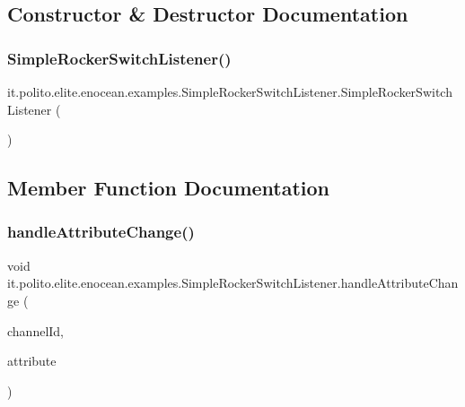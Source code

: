\subsection{Constructor \& Destructor Documentation}
\hypertarget{classit_1_1polito_1_1elite_1_1enocean_1_1examples_1_1_simple_rocker_switch_listener_a7d484d2ffa6d7c912dabd28a76becdda}{}\label{classit_1_1polito_1_1elite_1_1enocean_1_1examples_1_1_simple_rocker_switch_listener_a7d484d2ffa6d7c912dabd28a76becdda} 
\subsubsection{\texorpdfstring{Simple\+Rocker\+Switch\+Listener()}{SimpleRockerSwitchListener()}}
{\footnotesize\ttfamily it.\+polito.\+elite.\+enocean.\+examples.\+Simple\+Rocker\+Switch\+Listener.\+Simple\+Rocker\+Switch\+Listener (\begin{DoxyParamCaption}{ }\end{DoxyParamCaption})}



\subsection{Member Function Documentation}
\hypertarget{classit_1_1polito_1_1elite_1_1enocean_1_1examples_1_1_simple_rocker_switch_listener_a240a314a6f13130d31c70dac34ad0348}{}\label{classit_1_1polito_1_1elite_1_1enocean_1_1examples_1_1_simple_rocker_switch_listener_a240a314a6f13130d31c70dac34ad0348} 
\subsubsection{\texorpdfstring{handle\+Attribute\+Change()}{handleAttributeChange()}}
{\footnotesize\ttfamily void it.\+polito.\+elite.\+enocean.\+examples.\+Simple\+Rocker\+Switch\+Listener.\+handle\+Attribute\+Change (\begin{DoxyParamCaption}\item[{int}]{channel\+Id,  }\item[{\hyperlink{classit_1_1polito_1_1elite_1_1enocean_1_1enj_1_1eep_1_1_e_e_p_attribute}{E\+E\+P\+Attribute}$<$?$>$}]{attribute }\end{DoxyParamCaption})}

